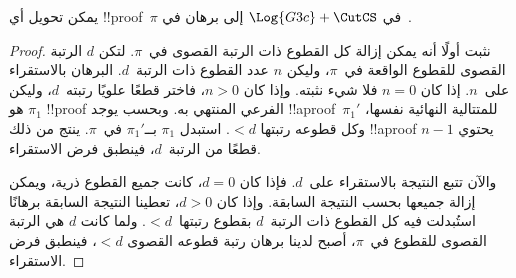 \documentclass[../../../include/open-logic-section]{subfiles}
\begin{document}
\begin{thm}
يمكن تحويل أي !!{proof}~$\pi$ في $\Log{G3c} + \CutCS$ إلى برهان في~.
\end{thm}

\begin{proof}
  نثبت أولًا أنه يمكن إزالة كل القطوع ذات الرتبة القصوى في~$\pi$. لتكن
  $d$ الرتبة القصوى للقطوع الواقعة في~$\pi$، وليكن $n$ عدد القطوع ذات
  الرتبة~$d$. البرهان بالاستقراء على~$n$. إذا كان $n=0$ فلا شيء نثبته.
  وإذا كان $n>0$، فاختر قطعًا علويًا رتبته~$d$، وليكن $\pi_1$ هو
  !!{proof} الفرعي المنتهي به. وبحسب  يوجد
  !!a{proof}~$\pi_1'$ للمتتالية النهائية نفسها، وكل قطوعه رتبتها $<d$.
  استبدل $\pi_1$ بــ$\pi_1'$ في~$\pi$. ينتج من ذلك !!a{proof} يحتوي
  $n-1$ قطعًا من الرتبة~$d$، فينطبق فرض الاستقراء.

  والآن تتبع النتيجة بالاستقراء على~$d$. فإذا كان $d=0$، كانت جميع القطوع
  ذرية، ويمكن إزالة جميعها بحسب النتيجة السابقة. وإذا كان $d>0$، تعطينا
  النتيجة السابقة برهانًا استُبدلت فيه كل القطوع ذات الرتبة~$d$ بقطوع
  رتبتها~$<d$. ولما كانت $d$ هي الرتبة القصوى للقطوع في~$\pi$، أصبح لدينا
  برهان رتبة قطوعه القصوى $<d$، فينطبق فرض الاستقراء.
\end{proof}
\end{document}
